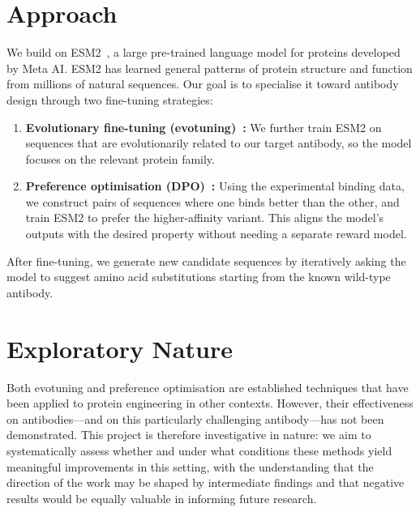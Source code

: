 \documentclass[11pt, a4paper]{article}
\begin{document}
\section*{Approach}
 
We build on ESM2~\cite{lin2023evolutionary}, a large pre-trained language model for proteins developed by Meta AI. ESM2 has learned general patterns of protein structure and function from millions of natural sequences. Our goal is to specialise it toward antibody design through two fine-tuning strategies:
 
\begin{enumerate}[nosep]
    \item \textbf{Evolutionary fine-tuning (evotuning)~\cite{alley2019unified}:} We further train ESM2 on sequences that are evolutionarily related to our target antibody, so the model focuses on the relevant protein family.
    \item \textbf{Preference optimisation (DPO)~\cite{rafailov2023direct, ferragu2025gdpo}:} Using the experimental binding data, we construct pairs of sequences where one binds better than the other, and train ESM2 to prefer the higher-affinity variant. This aligns the model's outputs with the desired property without needing a separate reward model.
\end{enumerate}
 
After fine-tuning, we generate new candidate sequences by iteratively asking the model to suggest amino acid substitutions starting from the known wild-type antibody.
 
 
\section*{Exploratory Nature}
 
Both evotuning and preference optimisation are established techniques that have been applied to protein engineering in other contexts. However, their effectiveness on antibodies---and on this particularly challenging antibody---has not been demonstrated. This project is therefore investigative in nature: we aim to systematically assess whether and under what conditions these methods yield meaningful improvements in this setting, with the understanding that the direction of the work may be shaped by intermediate findings and that negative results would be equally valuable in informing future research.
  
\end{document}
